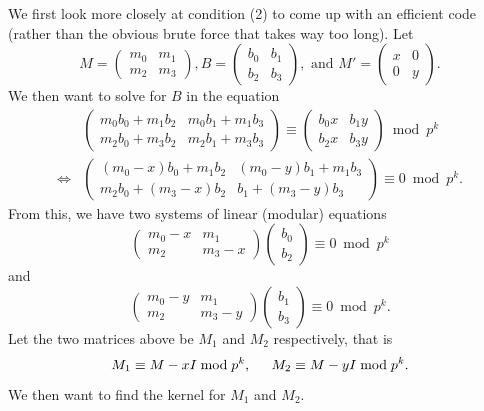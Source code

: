 \documentclass[letterpaper,12pt]{article}
\begin{document}
We first look more closely at condition (2) to come up with 
an efficient code (rather than the obvious brute force that takes way too long).
Let 
\[
M = \begin{pmatrix}
m_0 & m_1 \\ m_2 & m_3
\end{pmatrix},
B = \begin{pmatrix}
b_0 & b_1 \\ b_2 & b_3
\end{pmatrix},
\text{ and }
M' = \begin{pmatrix}
x & 0 \\ 0 & y
\end{pmatrix}.
\]
We then want to solve for $B$ in the equation 
\begin{align*}
&\begin{pmatrix}
m_0b_0 + m_1b_2 & m_0b_1 + m_1b_3 \\ m_2b_0 + m_3b_2 & m_2b_1 + m_3b_3
\end{pmatrix}
\equiv 
\begin{pmatrix}
b_0x & b_1y \\ b_2x & b_3y
\end{pmatrix} \bmod p^k \\
\iff &
\begin{pmatrix}
(m_0-x)b_0 + m_1b_2 & (m_0-y)b_1 + m_1b_3 \\ m_2b_0 + (m_3-x)b_2 & b_1 + (m_3-y)b_3
\end{pmatrix}
\equiv 
0 \bmod p^k.
\end{align*}
From this, we have two systems of linear (modular) equations
\[
\begin{pmatrix}
m_0 - x & m_1 \\ m_2 & m_3-x
\end{pmatrix}
\begin{pmatrix}
b_0 \\ b_2
\end{pmatrix}
\equiv 0 \bmod p^k
\]
and 
\[
\begin{pmatrix}
m_0 - y & m_1 \\ m_2 & m_3-y
\end{pmatrix}
\begin{pmatrix}
b_1 \\ b_3
\end{pmatrix}
\equiv 0 \bmod p^k.
\]
Let the two matrices above be $M_1$ and $M_2$ respectively, that is 
\[
M_1 \equiv M - xI \bmod p^k, \hspace{0.2in}
M_2 \equiv M - yI \bmod p^k.
\]
We then want to find the kernel for $M_1$ and $M_2$.
\end{document}
